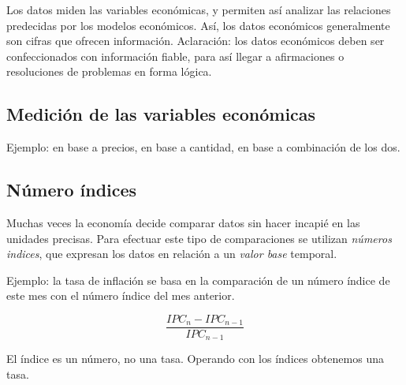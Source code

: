Los datos miden las variables económicas,
y permiten así analizar las relaciones predecidas por los modelos económicos.
Así,
los datos económicos generalmente son cifras que ofrecen información.
Aclaración: los datos económicos deben ser confeccionados con información fiable,
para así llegar a afirmaciones o resoluciones de problemas en forma lógica.

\subsection{Medición de las variables económicas}

Ejemplo: en base a precios,
en base a cantidad,
en base a combinación de los dos.

\subsection{Número índices}

Muchas veces la economía decide comparar datos sin hacer incapié en las unidades precisas.
Para efectuar este tipo de comparaciones se utilizan \textit{números indices},
que expresan los datos en relación a un \textit{valor base} temporal.

Ejemplo:
la tasa de inflación se basa en la comparación de un número índice de este mes
con el número índice del mes anterior.

\begin{equation*}
    \frac{IPC_{n} - IPC_{n-1}}{IPC_{n-1}}
\end{equation*}

El índice es un número, no una tasa.
Operando con los índices obtenemos una tasa.
